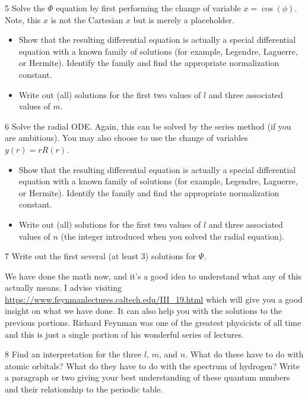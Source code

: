 \documentclass{article}
\begin{document}
\begin{problem}{}{5}
Solve the $\Phi$ equation by first performing the change of variable $x=\cos(\phi)$. Note, this $x$ is not the Cartesian $x$ but is merely a placeholder.  
\begin{itemize}
    \item Show that the resulting differential equation is actually a special differential equation with a known family of solutions (for example, Legendre, Laguerre, or Hermite). Identify the family and find the appropriate normalization constant.
    \item Write out (all) solutions for the first two values of $l$ and three associated values of $m$.
\end{itemize}
\end{problem}

\begin{problem}{}{6}
Solve the radial ODE. Again, this can be solved by the series method (if you are ambitious).  You may also choose to use the change of variables $y(r)=rR(r)$.
\begin{itemize}
    \item Show that the resulting differential equation is actually a special differential equation with a known family of solutions (for example, Legendre, Laguerre, or Hermite). Identify the family and find the appropriate normalization constant.
    \item Write out (all) solutions for the first two values of $l$ and three associated values of $n$ (the integer introduced when you solved the radial equation).  
\end{itemize}
\end{problem}

\begin{problem}{}{7}
Write out the first several (at least 3) solutions for $\Psi$.
\end{problem}

\noindent We have done the math now, and it's a good idea to understand what any of this actually means.  I advise visiting \url{https://www.feynmanlectures.caltech.edu/III_19.html} which will give you a good insight on what we have done.  It can also help you with the solutions to the previous portions.  Richard Feynman was one of the greatest physicists of all time and this is just a single portion of his wonderful series of lectures.

\begin{problem}{}{8}
Find an interpretation for the three  $l$, $m$, and $n$.  What do these have to do with atomic orbitals? What do they have to do with the spectrum of hydrogen? Write a paragraph or two giving your best understanding of these quantum numbers and their relationship to the periodic table.
\end{problem}
\end{document}
